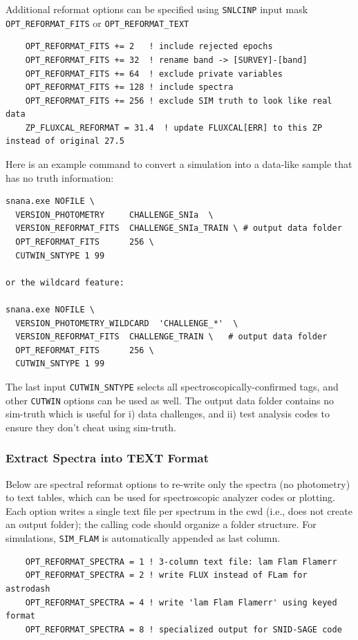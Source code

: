 \documentclass[12pt]{article}
\begin{document}
\medskip
Additional reformat options can be specified using {\tt SNLCINP} input mask
{\tt OPT\_REFORMAT\_FITS} or {\tt OPT\_REFORMAT\_TEXT}
\begin{verbatim}  
    OPT_REFORMAT_FITS += 2   ! include rejected epochs
    OPT_REFORMAT_FITS += 32  ! rename band -> [SURVEY]-[band]
    OPT_REFORMAT_FITS += 64  ! exclude private variables
    OPT_REFORMAT_FITS += 128 ! include spectra
    OPT_REFORMAT_FITS += 256 ! exclude SIM truth to look like real data
    ZP_FLUXCAL_REFORMAT = 31.4  ! update FLUXCAL[ERR] to this ZP instead of original 27.5
\end{verbatim}
%
Here is an example command to convert a simulation into a data-like
sample that has no truth information:
\begin{verbatim}    
snana.exe NOFILE \
  VERSION_PHOTOMETRY     CHALLENGE_SNIa  \
  VERSION_REFORMAT_FITS  CHALLENGE_SNIa_TRAIN \ # output data folder
  OPT_REFORMAT_FITS      256 \
  CUTWIN_SNTYPE 1 99

or the wildcard feature:

snana.exe NOFILE \
  VERSION_PHOTOMETRY_WILDCARD  'CHALLENGE_*'  \
  VERSION_REFORMAT_FITS  CHALLENGE_TRAIN \   # output data folder
  OPT_REFORMAT_FITS      256 \
  CUTWIN_SNTYPE 1 99

\end{verbatim}     
%
The last input {\tt CUTWIN\_SNTYPE} selects all 
spectroscopically-confirmed tags, and other {\tt CUTWIN} 
options can be used as well. 
The output data folder contains no sim-truth which
is useful for i) data challenges, and ii) test analysis codes
to ensure they don't cheat using sim-truth.




\clearpage
  \subsubsection{Extract Spectra into TEXT Format}
  \label{sss:extract_spectra}

Below are spectral reformat options to re-write only the spectra (no photometry) 
to text tables, which can be used for
spectroscopic analyzer codes or plotting. 
Each option writes a single text file per spectrum in the cwd 
(i.e., does not create an output folder); 
the calling code should organize a folder structure.
For simulations, {\tt SIM\_FLAM} is automatically appended as last column.

\begin{verbatim}  
    OPT_REFORMAT_SPECTRA = 1 ! 3-column text file: lam Flam Flamerr
    OPT_REFORMAT_SPECTRA = 2 ! write FLUX instead of FLam for astrodash
    OPT_REFORMAT_SPECTRA = 4 ! write 'lam Flam Flamerr' using keyed format
    OPT_REFORMAT_SPECTRA = 8 ! specialized output for SNID-SAGE code
\end{verbatim}
\end{document}
